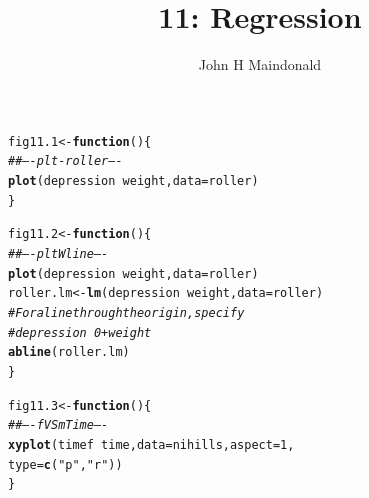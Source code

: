 \documentclass[12pt, a4paper,  BCOR=8.25mm, DIV=15]{scrartcl}\usepackage[]{graphicx}\usepackage[]{color}
\makeatletter
\newcommand{\hlnum}[1]{\textcolor[rgb]{0.686,0.059,0.569}{#1}}%
\newcommand{\hlstr}[1]{\textcolor[rgb]{0.192,0.494,0.8}{#1}}%
\newcommand{\hlcom}[1]{\textcolor[rgb]{0.678,0.584,0.686}{\textit{#1}}}%
\newcommand{\hlopt}[1]{\textcolor[rgb]{0,0,0}{#1}}%
\newcommand{\hlstd}[1]{\textcolor[rgb]{0.345,0.345,0.345}{#1}}%
\newcommand{\hlkwa}[1]{\textcolor[rgb]{0.161,0.373,0.58}{\textbf{#1}}}%
\newcommand{\hlkwb}[1]{\textcolor[rgb]{0.69,0.353,0.396}{#1}}%
\newcommand{\hlkwc}[1]{\textcolor[rgb]{0.333,0.667,0.333}{#1}}%
\newcommand{\hlkwd}[1]{\textcolor[rgb]{0.737,0.353,0.396}{\textbf{#1}}}%
\newenvironment{kframe}{%
 \def\at@end@of@kframe{}%
 \ifinner\ifhmode%
  \def\at@end@of@kframe{\end{minipage}}%
  \begin{minipage}{\columnwidth}%
 \fi\fi%
 \def\FrameCommand##1{\hskip\@totalleftmargin \hskip-\fboxsep
 \colorbox{shadecolor}{##1}\hskip-\fboxsep
     \hskip-\linewidth \hskip-\@totalleftmargin \hskip\columnwidth}%
 \MakeFramed {\advance\hsize-\width
   \@totalleftmargin\z@ \linewidth\hsize
   \@setminipage}}%
 {\par\unskip\endMakeFramed%
 \at@end@of@kframe}
\newenvironment{knitrout}{}{} %
\makeatother
\begin{document}




\title{11: Regression}
\author{John H Maindonald}
\maketitle

\vspace*{-1cm}

\begin{knitrout}
\color{fgcolor}\begin{kframe}
\begin{alltt}
\hlstd{fig11.1} \hlkwb{<-} \hlkwa{function}\hlstd{()\{}
\hlcom{## ---- plt-roller ----}
\hlkwd{plot}\hlstd{(depression} \hlopt{~} \hlstd{weight,} \hlkwc{data}\hlstd{=roller)}
\hlstd{\}}
\end{alltt}
\end{kframe}
\end{knitrout}

\begin{knitrout}
\color{fgcolor}\begin{kframe}
\begin{alltt}
\hlstd{fig11.2} \hlkwb{<-} \hlkwa{function}\hlstd{()\{}
\hlcom{## ---- pltWline ----}
\hlkwd{plot}\hlstd{(depression} \hlopt{~} \hlstd{weight,} \hlkwc{data}\hlstd{=roller)}
\hlstd{roller.lm} \hlkwb{<-} \hlkwd{lm}\hlstd{(depression} \hlopt{~} \hlstd{weight,} \hlkwc{data}\hlstd{=roller)}
\hlcom{# For a line through the origin, specify}
\hlcom{# depression ~ 0 + weight}
\hlkwd{abline}\hlstd{(roller.lm)}
\hlstd{\}}
\end{alltt}
\end{kframe}
\end{knitrout}

\begin{knitrout}
\color{fgcolor}\begin{kframe}
\begin{alltt}
\hlstd{fig11.3} \hlkwb{<-} \hlkwa{function}\hlstd{()\{}
\hlcom{## ---- fVSmTime ----}
\hlkwd{xyplot}\hlstd{(timef}\hlopt{~}\hlstd{time,} \hlkwc{data}\hlstd{=nihills,} \hlkwc{aspect}\hlstd{=}\hlnum{1}\hlstd{,}
       \hlkwc{type}\hlstd{=}\hlkwd{c}\hlstd{(}\hlstr{"p"}\hlstd{,}\hlstr{"r"}\hlstd{))}
\hlstd{\}}
\end{alltt}
\end{kframe}
\end{knitrout}
\end{document}
